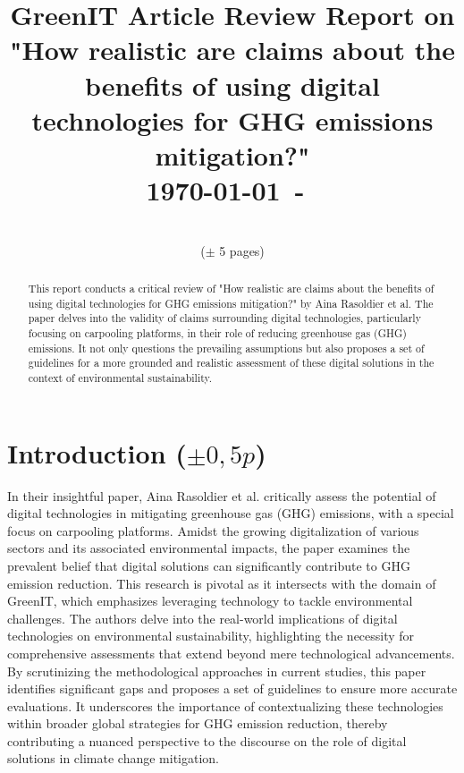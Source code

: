 \documentclass[conference,compsoc]{IEEEtran}
\begin{document}
\title{GreenIT Article Review Report on\\
"How realistic are claims about the benefits of using digital technologies for GHG emissions mitigation?"
\\

{\small \today~-~\currenttime}}

\author{
	\\
	($\pm$ 5 pages)\\}

\maketitle

\begin{abstract}

	This report conducts a critical review of "How realistic are claims about the benefits of using digital technologies for GHG emissions mitigation?" by Aina Rasoldier et al. The paper delves into the validity of claims surrounding digital technologies, particularly focusing on carpooling platforms, in their role of reducing greenhouse gas (GHG) emissions. It not only questions the prevailing assumptions but also proposes a set of guidelines for a more grounded and realistic assessment of these digital solutions in the context of environmental sustainability.

\end{abstract}

\section{Introduction ($\pm 0,5p$)}

In their insightful paper, Aina Rasoldier et al.
critically assess the potential of digital technologies
in mitigating greenhouse gas (GHG) emissions, with a special focus on carpooling platforms. Amidst the growing digitalization of various sectors and its associated environmental impacts, the paper examines the prevalent belief that digital solutions can significantly contribute to GHG emission reduction. This research is pivotal as it intersects with the domain of GreenIT, which emphasizes leveraging technology to tackle environmental challenges. The authors delve into the real-world implications of digital technologies on environmental sustainability, highlighting the necessity for comprehensive assessments that extend beyond mere technological advancements. By scrutinizing the methodological approaches in current studies, this paper identifies significant gaps and proposes a set of guidelines to ensure more accurate evaluations. It underscores the importance of contextualizing these technologies within broader global strategies for GHG emission reduction, thereby contributing a nuanced perspective to the discourse on the role of digital solutions in climate change mitigation.
\end{document}
